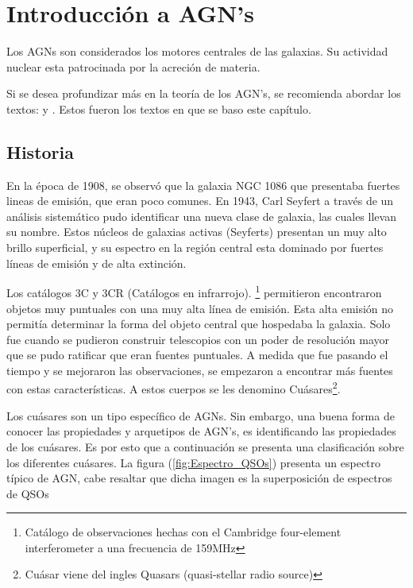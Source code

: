 \section{Introducción a AGN's}
\label{sec:Introduction_AGN's}

Los AGNs son considerados los motores centrales de las galaxias. Su  actividad nuclear esta patrocinada por la acreción de materia. 

Si se desea profundizar más en la teoría de los AGN's, se recomienda abordar los textos: \cite{schneider2006} y \cite{carroll2007}. Estos fueron los textos en que se baso este capítulo. 


	\subsection{Historia}
	\label{subsec:History}
	
En la época de 1908, se observó que la galaxia NGC 1086 que presentaba fuertes lineas de emisión, que eran poco comunes. En 1943, Carl Seyfert a través de un análisis sistemático pudo identificar una nueva clase de galaxia, las cuales llevan su nombre. Estos núcleos de galaxias activas (Seyferts) presentan un muy alto brillo superficial, y su espectro en la región central esta dominado por fuertes líneas de emisión y de alta extinción.  

Los catálogos 3C y 3CR (Catálogos en infrarrojo). \footnote{Catálogo de observaciones hechas con el Cambridge four-element interferometer a una frecuencia de 159MHz} permitieron encontraron objetos muy puntuales con una muy alta línea de emisión. Esta alta emisión no permitía determinar la forma del objeto central que hospedaba la galaxia. Solo fue cuando se pudieron construir telescopios con un poder de resolución mayor que se pudo ratificar que eran fuentes puntuales. A medida que fue pasando el tiempo y se mejoraron  las observaciones, se empezaron a encontrar más fuentes con estas características. A estos cuerpos se les denomino  Cuásares\footnote{Cuásar viene del ingles Quasars (quasi-stellar radio source)}.

Los cuásares son un tipo específico de AGNs. Sin embargo, una buena forma de conocer las propiedades y arquetipos de  AGN's, es identificando las propiedades de los cuásares. Es por esto que a continuación se presenta una clasificación sobre los diferentes cuásares.  La figura (\ref{fig:Espectro_QSOs}) presenta un espectro típico de AGN, cabe resaltar que dicha imagen es la superposición de espectros de QSOs

